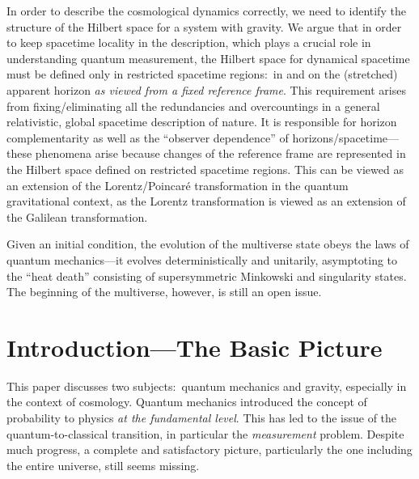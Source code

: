 \documentclass[12pt]{article}
\begin{document}
\begin{titlepage}
\begin{center}
{ In order to describe the cosmological dynamics correctly, we need to 
 identify the structure of the Hilbert space for a system with gravity. 
 We argue that in order to keep spacetime locality in the description, 
 which plays a crucial role in understanding quantum measurement, the 
 Hilbert space for dynamical spacetime must be defined only in restricted 
 spacetime regions:\ in and on the (stretched) apparent horizon {\it as 
 viewed from a fixed reference frame}.  This requirement arises from 
 fixing/eliminating all the redundancies and overcountings in a general 
 relativistic, global spacetime description of nature.  It is responsible 
 for horizon complementarity as well as the ``observer dependence'' 
 of horizons/spacetime---these phenomena arise because changes of 
 the reference frame are represented in the Hilbert space defined on 
 restricted spacetime regions.  This can be viewed as an extension of 
 the Lorentz/Poincar\'{e} transformation in the quantum gravitational 
 context, as the Lorentz transformation is viewed as an extension of 
 the Galilean transformation.

 Given an initial condition, the evolution of the multiverse state 
 obeys the laws of quantum mechanics---it evolves deterministically 
 and unitarily, asymptoting to the ``heat death'' consisting of 
 supersymmetric Minkowski and singularity states.  The beginning 
 of the multiverse, however, is still an open issue.}

\newpage

\tableofcontents

\end{center}
\end{titlepage}


\section{Introduction---The Basic Picture}
\label{sec:intro}

This paper discusses two subjects:\ quantum mechanics and gravity, 
especially in the context of cosmology.  Quantum mechanics introduced 
the concept of probability to physics {\it at the fundamental level}. 
This has led to the issue of the quantum-to-classical transition, in 
particular the {\it measurement} problem.  Despite much progress, a 
complete and satisfactory picture, particularly the one including the 
entire universe, still seems missing.
\end{document}
